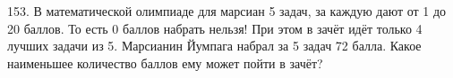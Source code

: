 153. В математической олимпиаде для марсиан 5 задач, за каждую дают от 1 до 20 баллов. То есть 0 баллов набрать нельзя! При этом в зачёт идёт только 4 лучших задачи из 5. Марсианин Йумпага набрал за 5 задач 72 балла. Какое наименьшее количество баллов ему может пойти в зачёт?\\
